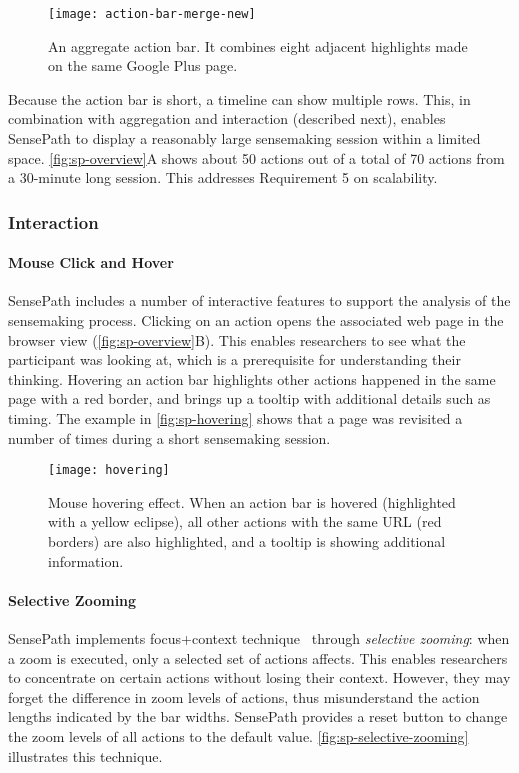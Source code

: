 \begin{figure}[!htb]
\centering
\texttt{[image: action-bar-merge-new]}
\caption{An aggregate action bar. It combines eight adjacent highlights made on the same Google Plus page.}
\label{fig:sp-action-bar-merge}
\end{figure}

Because the action bar is short, a timeline can show multiple rows. This, in combination with aggregation and interaction (described next), enables SensePath to display a reasonably large sensemaking session within a limited space. \autoref{fig:sp-overview}A shows about 50 actions out of a total of 70 actions from a 30-minute long session. This addresses Requirement 5 on scalability.

\subsubsection{Interaction}
\paragraph{Mouse Click and Hover}
SensePath includes a number of interactive features to support the analysis of the sensemaking process. Clicking on an action opens the associated web page in the browser view (\autoref{fig:sp-overview}B). This enables researchers to see what the participant was looking at, which is a prerequisite for understanding their thinking. Hovering an action bar highlights other actions happened in the same page with a red border, and brings up a tooltip with additional details such as timing. The example in \autoref{fig:sp-hovering} shows that a page was revisited a number of times during a short sensemaking session.

\begin{figure}[!htb]
\centering
\texttt{[image: hovering]}
\caption{Mouse hovering effect. When an action bar is hovered (highlighted with a yellow eclipse), all other actions with the same URL (red borders) are also highlighted, and a tooltip is showing additional information.}
\label{fig:sp-hovering}
\end{figure}

\paragraph{Selective Zooming}
SensePath implements focus+context technique~\cite{Cockburn2009} through \emph{selective zooming}: when a zoom is executed, only a selected set of actions affects. This enables researchers to concentrate on certain actions without losing their context. However, they may forget the difference in zoom levels of actions, thus misunderstand the action lengths indicated by the bar widths. SensePath provides a reset button to change the zoom levels of all actions to the default value. \autoref{fig:sp-selective-zooming} illustrates this technique.

